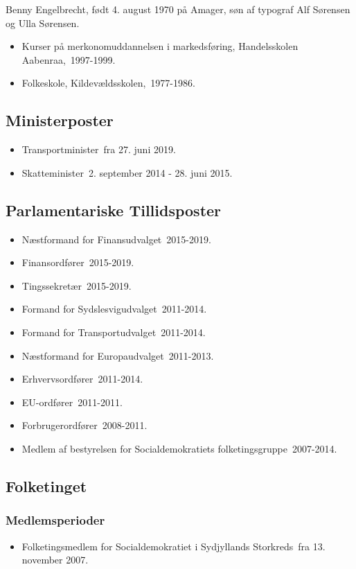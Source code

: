 \documentclass[11pt, a4paper]{awesome-cv}
\begin{document}
\makecvheader[R]
\makelettertitle
\begin{cvletter}
Benny Engelbrecht, født 4. august 1970 på Amager, søn af typograf Alf Sørensen og Ulla Sørensen.

\begin{itemize}
\item Kurser på merkonomuddannelsen i markedsføring, Handelsskolen Aabenraa, 1997-1999.
\item Folkeskole, Kildevældsskolen, 1977-1986.
\end{itemize}
\subsection*{Ministerposter}
\begin{itemize}
\item Transportminister fra 27. juni 2019.
\item Skatteminister 2. september 2014 - 28. juni 2015.
\end{itemize}
\subsection*{Parlamentariske Tillidsposter}
\begin{itemize}
\item Næstformand for Finansudvalget 2015-2019.
\item Finansordfører 2015-2019.
\item Tingssekretær 2015-2019.
\item Formand for Sydslesvigudvalget 2011-2014.
\item Formand for Transportudvalget 2011-2014.
\item Næstformand for Europaudvalget 2011-2013.
\item Erhvervsordfører 2011-2014.
\item EU-ordfører 2011-2011.
\item Forbrugerordfører 2008-2011.
\item Medlem af bestyrelsen for Socialdemokratiets folketingsgruppe 2007-2014.
\end{itemize}
\subsection*{Folketinget}
\subsubsection*{Medlemsperioder}
\begin{itemize}
\item Folketingsmedlem for Socialdemokratiet i Sydjyllands Storkreds fra 13. november 2007.
\end{itemize}

\end{cvletter}
\end{document}
